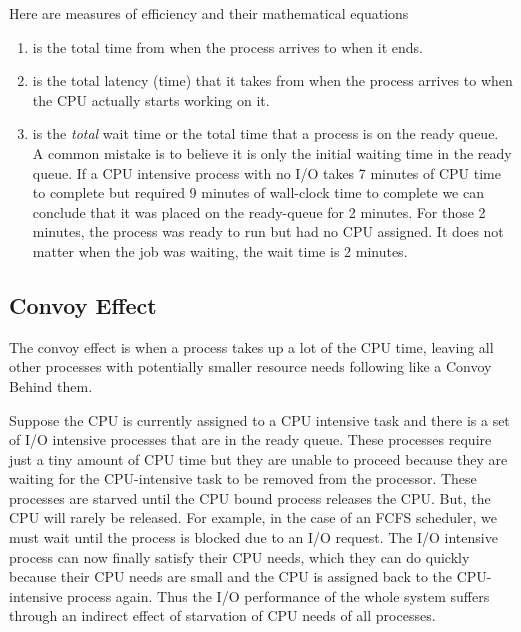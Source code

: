Here are measures of efficiency and their mathematical equations

\begin{enumerate}
\item {} is the total time from when the process arrives to when it ends.
  \item {} is the total latency (time) that it takes from when the process arrives to when the CPU actually starts working on it.
  \item {} is the \emph{total} wait time or the total time that a process is on the ready queue.
    A common mistake is to believe it is only the initial waiting time in the ready queue.
    If a CPU intensive process with no I/O takes 7 minutes of CPU time to complete but required 9 minutes of wall-clock time to complete we can conclude that it was placed on the ready-queue for 2 minutes.
    For those 2 minutes, the process was ready to run but had no CPU assigned.
    It does not matter when the job was waiting, the wait time is 2 minutes.

\end{enumerate}

\subsection{Convoy Effect}

The convoy effect is when a process takes up a lot of the CPU time, leaving all other processes with potentially smaller resource needs following like a Convoy Behind them.

Suppose the CPU is currently assigned to a CPU intensive task and there is a set of I/O intensive processes that are in the ready queue.
These processes require just a tiny amount of CPU time but they are unable to proceed because they are waiting for the CPU-intensive task to be removed from the processor.
These processes are starved until the CPU bound process releases the CPU.
But, the CPU will rarely be released.
For example, in the case of an FCFS scheduler, we must wait until the process is blocked due to an I/O request.
The I/O intensive process can now finally satisfy their CPU needs, which they can do quickly because their CPU needs are small and the CPU is assigned back to the CPU-intensive process again.
Thus the I/O performance of the whole system suffers through an indirect effect of starvation of CPU needs of all processes.

